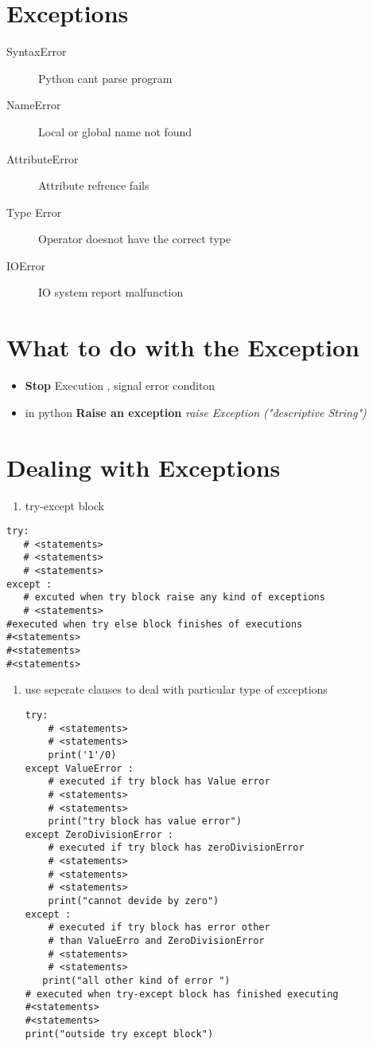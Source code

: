 \documentclass[11pt]{article}
\date{\today}
\title{}
\begin{document}
\tableofcontents

\section{Exceptions}
\label{sec:orge9612c4}
\begin{description}
\item[{SyntaxError}] Python cant parse program
\item[{NameError}] Local or global name not found
\item[{AttributeError}] Attribute refrence fails
\item[{Type Error}] Operator doesnot have the correct type
\item[{IOError}] IO system report malfunction
\end{description}


\section{What to do with the Exception}
\label{sec:orge6cc42c}
\begin{itemize}
\item \textbf{Stop} Execution , signal error conditon
\item in python \textbf{Raise an exception}
\emph{raise Exception ("descriptive String")}
\end{itemize}

\section{Dealing with Exceptions}
\label{sec:org777571c}
\begin{enumerate}
\item try-except block
\end{enumerate}
\begin{verbatim}
try:
   # <statements>
   # <statements>
   # <statements>
except :
   # excuted when try block raise any kind of exceptions
   # <statements>
#executed when try else block finishes of executions
#<statements>
#<statements>
#<statements>
\end{verbatim}

\begin{enumerate}
\item use seperate clauses to deal with particular type of exceptions
\begin{verbatim}
try:
    # <statements>
    # <statements>
    print('1'/0)
except ValueError :
    # executed if try block has Value error
    # <statements>
    # <statements>
    print("try block has value error")
except ZeroDivisionError :
    # executed if try block has zeroDivisionError
    # <statements>
    # <statements>
    # <statements>
    print("cannot devide by zero")
except :
    # executed if try block has error other
    # than ValueErro and ZeroDivisionError
    # <statements>
    # <statements>
   print("all other kind of error ")
# executed when try-except block has finished executing
#<statements>
#<statements>
print("outside try except block")
\end{verbatim}
\end{enumerate}
\end{document}
